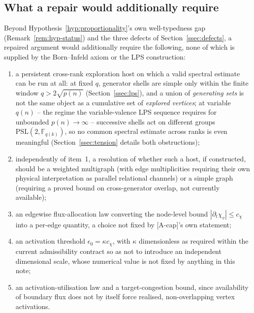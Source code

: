 \documentclass[11pt,a4paper]{article}
\theoremstyle{definition}
\theoremstyle{remark}
\begin{document}
  \subsection{What a repair would additionally require}
    \label{ssec:repair}

    Beyond Hypothesis~\ref{hyp:proportionality}'s own well-typedness gap
    (Remark~\ref{rem:hyp-status}) and the three defects of
    Section~\ref{ssec:defects}, a repaired argument would additionally require the following,
    none of which is supplied by the Born--Infeld axiom or the LPS construction:

    \begin{enumerate}
      \item a persistent cross-rank exploration host on which a valid spectral estimate can
        be run at all: at fixed $q$, generator shells are simple only within the finite
        window $q>2\sqrt{p(n)}$ (Section~\ref{ssec:lps}), and a union of \emph{generating
        sets} is not the same object as a cumulative set of \emph{explored vertices}; at
        variable $q(n)$ -- the regime the variable-valence LPS sequence requires for
        unbounded $p(n)\to\infty$ -- successive shells act on different groups
        $\mathrm{PSL}(2,\mathbb F_{q(k)})$, so no common spectral estimate across ranks is
        even meaningful (Section~\ref{ssec:tension} details both obstructions);
      \item independently of item~1, a resolution of whether such a host, if constructed,
        should be a weighted multigraph (with edge multiplicities requiring their own
        physical interpretation as parallel relational channels) or a simple graph (requiring
        a proved bound on cross-generator overlap, not currently available);
      \item an edgewise flux-allocation law converting the node-level bound
        $|\partial_t\chi_v|\leq c_\chi$ into a per-edge quantity, a choice not fixed by
        [A-cap]'s own statement;
      \item an activation threshold $\epsilon_0 = \kappa c_\chi$, with $\kappa$ dimensionless
        as required within the current admissibility contract so as not to introduce an
        independent dimensional scale, whose numerical value is not fixed by anything in this
        note;
      \item an activation-utilisation law and a target-congestion bound, since availability
        of boundary flux does not by itself force realised, non-overlapping vertex
        activations.
    \end{enumerate}
\end{document}
